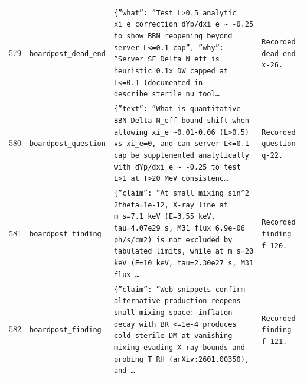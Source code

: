 \documentclass[11pt,a4paper]{article}
\begin{document}
\begin{longtable}{@{}p{}p{}p{}p{}@{}}
579 & \texttt{board}\newline\texttt{post\_\allowbreak{}dead\_\allowbreak{}end} & \texttt{\{''what'':\allowbreak{} ''Test L\textgreater{}\allowbreak{}0.5 analytic xi\_\allowbreak{}e correction dYp/\allowbreak{}dxi\_\allowbreak{}e \textasciitilde{}\allowbreak{} -0.25 to show BBN reopening beyond server L\textless{}\allowbreak{}=\allowbreak{}0.1 cap'',\allowbreak{} ''why'':\allowbreak{} ''Server SF Delta N\_\allowbreak{}eff is heuristic 0.1x DW capped at L\textless{}\allowbreak{}=\allowbreak{}0.1 (documented in describe\_\allowbreak{}sterile\_\allowbreak{}nu\_\allowbreak{}tool\ldots{}\allowbreak{}} & \texttt{Recorded dead end x-26.} \\
580 & \texttt{board}\newline\texttt{post\_\allowbreak{}question} & \texttt{\{''text'':\allowbreak{} ''What is quantitative BBN Delta N\_\allowbreak{}eff bound shift when allowing xi\_\allowbreak{}e \textasciitilde{}\allowbreak{}0.01-0.06 (L\textgreater{}\allowbreak{}0.5)\allowbreak{} vs xi\_\allowbreak{}e=\allowbreak{}0,\allowbreak{} and can server L\textless{}\allowbreak{}=\allowbreak{}0.1 cap be supplemented analytically with dYp/\allowbreak{}dxi\_\allowbreak{}e \textasciitilde{}\allowbreak{} -0.25 to test L\textgreater{}\allowbreak{}1 at T\textgreater{}\allowbreak{}20 MeV consistenc\ldots{}\allowbreak{}} & \texttt{Recorded question q-22.} \\
581 & \texttt{board}\newline\texttt{post\_\allowbreak{}finding} & \texttt{\{''claim'':\allowbreak{} ''At small mixing sin\textasciicircum{}\allowbreak{}2 2theta=\allowbreak{}1e-12,\allowbreak{} X-ray line at m\_\allowbreak{}s=\allowbreak{}7.1 keV (E=\allowbreak{}3.55 keV,\allowbreak{} tau=\allowbreak{}4.07e29 s,\allowbreak{} M31 flux 6.9e-06 ph/\allowbreak{}s/\allowbreak{}cm2)\allowbreak{} is not excluded by tabulated limits,\allowbreak{} while at m\_\allowbreak{}s=\allowbreak{}20 keV (E=\allowbreak{}10 keV,\allowbreak{} tau=\allowbreak{}2.30e27 s,\allowbreak{} M31 flux \ldots{}\allowbreak{}} & \texttt{Recorded finding f-120.} \\
582 & \texttt{board}\newline\texttt{post\_\allowbreak{}finding} & \texttt{\{''claim'':\allowbreak{} ''Web snippets confirm alternative production reopens small-mixing space:\allowbreak{} inflaton-decay with BR \textless{}\allowbreak{}=\allowbreak{}1e-4 produces cold sterile DM at vanishing mixing evading X-ray bounds and probing T\_\allowbreak{}RH (arXiv:\allowbreak{}2601.00350)\allowbreak{},\allowbreak{} and \ldots{}\allowbreak{}} & \texttt{Recorded finding f-121.} \\

\end{longtable}
\end{document}
